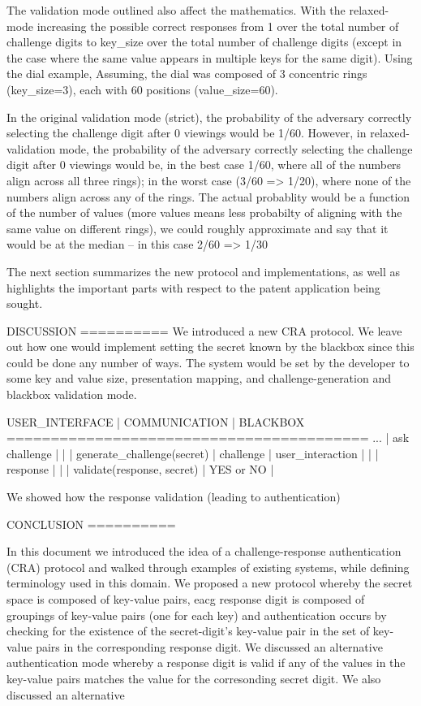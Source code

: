 \documentclass[12pt]{document}
\begin{document}
\begin{Introduction}
The validation mode outlined also affect the mathematics.
With the relaxed-mode increasing the possible correct responses from 1 over the total number of challenge digits to key_size over the total number of challenge digits (except in the case where the same value appears in multiple keys for the same digit).
Using the dial example, 
Assuming, the dial was composed of 3 concentric rings (key_size=3), each with 60 positions (value_size=60).

In the original validation mode (strict),
  the probability of the adversary correctly selecting the challenge digit after 0 viewings would be 1/60.
However, in relaxed-validation mode,
  the probability of the adversary correctly selecting the challenge digit after 0 viewings would be,
    in the best case 1/60, where all of the numbers align across all three rings);
    in the worst case (3/60 => 1/20), where none of the numbers align across any of the rings.
  The actual probablity would be a function of the number of values (more values means less probabilty of aligning with the same value on different rings),
  we could roughly approximate and say that it would be at the median -- in this case 2/60 => 1/30


The next section summarizes the new protocol and implementations, as well as highlights the important parts with respect to the patent application being sought.

DISCUSSION
==========
We introduced a new CRA protocol. We leave out how one would implement setting the secret known by the blackbox since this could be done any number of ways.
The system would be set by the developer to some key and value size, presentation mapping, and challenge-generation and blackbox validation mode.

USER_INTERFACE | COMMUNICATION | BLACKBOX 
=========================================
...
                   | ask challenge |
                   |               | generate_challenge(secret)
                   | challenge     |
user_interaction   |               |               
                   | response      |               
                   |               | validate(response, secret)
                   | YES or NO     | 

 We showed how the response validation (leading to authentication) 



CONCLUSION
==========


In this document we introduced the idea of a challenge-response authentication (CRA) protocol and walked through examples of existing systems, while defining terminology used in this domain.
We proposed a new protocol whereby the secret space is composed of key-value pairs, eacg response digit is composed of groupings of key-value pairs (one for each key) and authentication occurs by checking for the existence of the secret-digit's key-value pair in the set of key-value pairs in the corresponding response digit.
We discussed an alternative authentication mode whereby a response digit is valid if any of the values in the key-value pairs matches the value for the corresonding secret digit.
We also discussed an alternative 


\end{Introduction}
\end{document}
